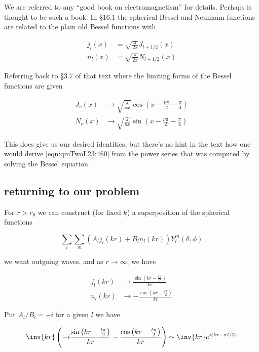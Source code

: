 We are referred to any ``good book on electromagnetism'' for details.  Perhaps \cite{jackson1975cew} is thought to be such a book.  In \S 16.1 the spherical Bessel and Neumann functions are related to the plain old Bessel functions with

\begin{align}\label{eqn:qmTwoL23:440}
j_l(x) &= \sqrt{\frac{\pi}{2x} } J_{l+1/2}(x) \\
n_l(x) &= \sqrt{\frac{\pi}{2x} } N_{l+1/2}(x)
\end{align}

Referring back to \S 3.7 of that text where the limiting forms of the Bessel functions are given

\begin{align}\label{eqn:qmTwoL23:460}
J_\nu(x) &\rightarrow \sqrt{\frac{2}{\pi x}} \cos\left(x - \frac{\nu\pi}{2} - \frac{\pi}{4} \right) \\
N_\nu(x) &\rightarrow \sqrt{\frac{2}{\pi x}} \sin\left(x - \frac{\nu\pi}{2} - \frac{\pi}{4} \right) 
\end{align}

This does give us our desired identities, but there's no hint in the text how one would derive \ref{eqn:qmTwoL23:460} from the power series that was computed by solving the Bessel equation.

\subsection{returning to our problem}

For $r > r_0$ we can construct (for fixed $k$) a superposition of the spherical functions

\begin{equation}\label{eqn:qmTwoL23:480}
\sum_l \sum_m \left( A_l j_l( k r ) + B_l n_l(k r) \right) Y_l^m(\theta, \phi)
\end{equation}

we want outgoing waves, and as $r \rightarrow \infty$, we have

\begin{align}\label{eqn:qmTwoL23:500}
j_l(k r) &\rightarrow \frac{\sin\left(kr - \frac{l \pi}{2}\right)}{k r} \\
n_l(k r) &\rightarrow -\frac{\cos\left(kr - \frac{l \pi}{2}\right)}{k r}
\end{align}

Put $A_l/B_l = -i$ for a given $l$ we have

\begin{equation}\label{eqn:qmTwoL23:520}
\inv{k r} \left( -i 
\frac{\sin\left(kr - \frac{l \pi}{2}\right)}{k r}
-\frac{\cos\left(kr - \frac{l \pi}{2}\right)}{k r} \right)
\sim \inv{k r} e^{i (k r - \pi l/2)}
\end{equation}

